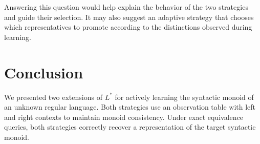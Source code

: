 \documentclass{ieice-tecrep}
\begin{document}
Answering this question would help explain the behavior of the two
strategies and guide their selection. It may also suggest an
adaptive strategy that chooses which representatives to promote
according to the distinctions observed during learning.

\section{Conclusion}\label{conclusion}

We presented two extensions of \(L^*\) for actively learning the
syntactic monoid of an unknown regular language. Both strategies use
an observation table with left and right contexts to maintain monoid
consistency. Under exact equivalence queries, both strategies
correctly recover a representation of the target syntactic monoid.




\end{document}
